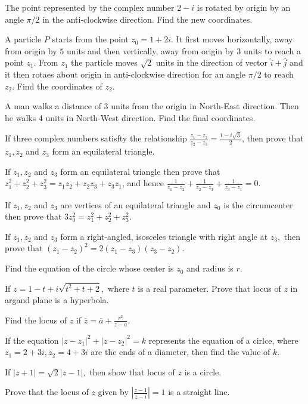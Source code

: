 \item The point represented by the complex number $2 - i$ is rotated by origin by an angle $\pi/2$ in the anti-clockwise
  direction. Find the new coordinates.
\item A particle $P$ starts from the point $z_0 = 1 + 2i$. It first moves horizontally, away from origin by $5$ units and then
  vertically, away from origin by $3$ units to reach a point $z_1$. From $z_1$ the particle moves $\sqrt{2}$ units in the
  direction of vector $\hat{i} + \hat{j}$ and it then rotaes about origin in anti-clockwise direction for an angle $\pi/2$
  to reach $z_2.$ Find the coordinates of $z_2$.
\item A man walks a distance of $3$ units from the origin in North-East direction. Then he walks $4$ units in North-West
  direction. Find the final coordinates.
\item If three complex numbers satisfty the relationship $\frac{z_1 - z_3}{z_2 - z_3} = \frac{1 - i\sqrt{3}}{2}$, then
  prove that $z_1, z_2$ and $z_3$ form an equilateral triangle.
\item If $z_1, z_2$ and $z_3$ form an equilateral triangle then prove that $z_1^2 + z_2^2 + z_3^2 = z_1z_2 + z_2z_3
  +z_3z_1$, and hence $\frac{1}{z_1 - z_2} + \frac{1}{z_2 - z_3} + \frac{1}{z_3 - z_1} = 0$.
\item If $z_1, z_2$ and $z_3$ are vertices of an equilateral triangle and $z_0$ is the circumcenter then prove that
  $3z_0^2 = z_1^2 + z_2^2 + z_3^2.$
\item If $z_1, z_2$ and $z_3$ form a right-angled, isosceles triangle with right angle at $z_3,$ then prove that $(z_1 -
  z_2)^2 = 2(z_1 - z_3)(z_3 - z_2)$.
\item Find the equation of the circle whose center is $z_0$ and radius is $r$.
\item If $z = 1 - t + i\sqrt{t^2 + t + 2},$ where $t$ is a real parameter. Prove that locus of $z$ in argand plane is a
  hyperbola.
\item Find the locus of $z$ if $\overline{z} = \overline{a} + \frac{r^2}{z - a}$.
\item If the equation $|z - z_1|^2 + |z - z_2|^2 = k$ represents the equation of a cirlce, where $z_1 = 2 + 3i, z_2 = 4 +
  3i$ are the ends of a diameter, then find the value of $k$.
\item If $|z + 1| = \sqrt{2}|z - 1|,$ then show that locus of $z$ is a circle.
\item Prove that the locus of $z$ given by $\left|\frac{z - 1}{z - i}\right| = 1$ is a straight line.
